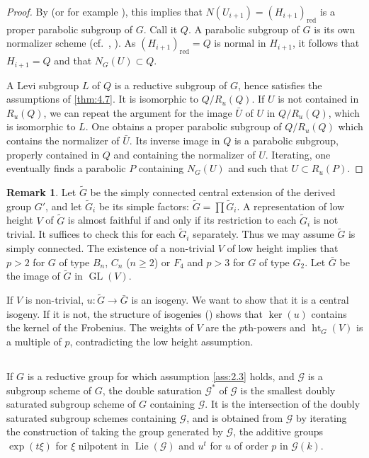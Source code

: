 \documentclass[11pt,a4paper]{article}
\theoremstyle{plain}
\theoremstyle{definition}
\newtheorem{remark}[theorem]{Remark}
\DeclareMathOperator{\Lie}{Lie}
\DeclareMathOperator{\GL}{GL}
\DeclareMathOperator{\htG}{ht}
\newcommand{\red}{\mathrm{red}}
\begin{document}
\begin{proof}
By \cite[Proposition~2.3, page~99]{BT} (or for example \cite[Section~30.3, Proposition on page~186]{H}), this implies that $N(U_{i+1}) = (H_{i+1})_\red$ is a proper parabolic subgroup of $G$. Call it $Q$. A parabolic subgroup of $G$ is its own normalizer scheme (cf.~\cite[SGA3, XII, 7.9]{SGA3}, \cite[page~469]{CGP}). As $(H_{i+1})_\red = Q$ is normal in $H_{i+1}$, it follows that $H_{i+1} = Q$ and that $N_G(U) \subset Q$.

A Levi subgroup $L$ of $Q$ is a reductive subgroup of $G$, hence satisfies the assumptions of \ref{thm:4.7}. It is isomorphic to $Q/R_u(Q)$. If $U$ is not contained in $R_u(Q)$, we can repeat the argument for the image $\bar{U}$ of $U$ in $Q/R_u(Q)$, which is isomorphic to $L$. One obtains a proper parabolic subgroup of $Q/R_u(Q)$ which contains the normalizer of $\bar{U}$. Its inverse image in $Q$ is a parabolic subgroup, properly contained in $Q$ and containing the normalizer of $U$. Iterating, one eventually finds a parabolic $P$ containing $N_G(U)$ and such that $U \subset R_u(P)$. \qedhere
\end{proof}

\begin{remark} \label{rem:4.9}
Let $\tilde{G}$ be the simply connected central extension of the derived group $G'$, and let $\tilde{G}_i$ be its simple factors: $\tilde{G} = \prod \tilde{G}_i$. A representation of low height $V$ of $\tilde{G}$ is almost faithful if and only if its restriction to each $\tilde{G}_i$ is not trivial. It suffices to check this for each $\tilde{G}_i$ separately. Thus we may assume $\tilde{G}$ is simply connected. The existence of a non-trivial $V$ of low height implies that $p > 2$ for $G$ of type $B_n$, $C_n$ ($n \geq 2$) or $F_4$ and $p > 3$ for $G$ of type $G_2$. Let $\bar{G}$ be the image of $\tilde{G}$ in $\GL(V)$.

If $V$ is non-trivial, $u : \tilde{G} \to \bar{G}$ is an isogeny. We want to show that it is a central isogeny. If it is not, the structure of isogenies (\cite[SGA3, XXII, 4.2.13]{SGA3}) shows that $\ker(u)$ contains the kernel of the Frobenius. The weights of $V$ are the $p$th-powers and $\htG_G(V)$ is a multiple of $p$, contradicting the low height assumption.
\end{remark}

\subsection{} \label{sec:4.10}
If $G$ is a reductive group for which assumption \ref{ass:2.3} holds, and $\mathcal{G}$ is a subgroup scheme of $G$, the double saturation $\mathcal{G}^*$ of $\mathcal{G}$ is the smallest doubly saturated subgroup scheme of $G$ containing $\mathcal{G}$. It is the intersection of the doubly saturated subgroup schemes containing $\mathcal{G}$, and is obtained from $\mathcal{G}$ by iterating the construction of taking the group generated by $\mathcal{G}$, the additive groups $\exp(t\xi)$ for $\xi$ nilpotent in $\Lie(\mathcal{G})$ and $u^t$ for $u$ of order $p$ in $\mathcal{G}(k)$.
\end{document}
